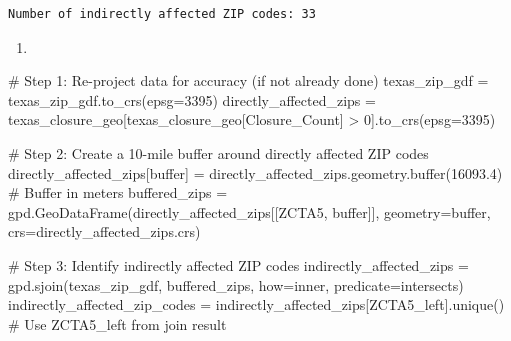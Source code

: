 \documentclass[
  letterpaper,
  DIV=11,
  numbers=noendperiod]{scrartcl}
\newenvironment{Shaded}{\begin{snugshade}}{\end{snugshade}}
\newcommand{\BuiltInTok}[1]{\textcolor[rgb]{0.00,0.23,0.31}{#1}}
\newcommand{\CommentTok}[1]{\textcolor[rgb]{0.37,0.37,0.37}{#1}}
\newcommand{\DecValTok}[1]{\textcolor[rgb]{0.68,0.00,0.00}{#1}}
\newcommand{\FloatTok}[1]{\textcolor[rgb]{0.68,0.00,0.00}{#1}}
\newcommand{\NormalTok}[1]{\textcolor[rgb]{0.00,0.23,0.31}{#1}}
\newcommand{\OperatorTok}[1]{\textcolor[rgb]{0.37,0.37,0.37}{#1}}
\newcommand{\StringTok}[1]{\textcolor[rgb]{0.13,0.47,0.30}{#1}}
\providecommand{\tightlist}{%
  \setlength{\itemsep}{0pt}\setlength{\parskip}{0pt}}\usepackage{longtable,booktabs,array}
\begin{document}
\begin{verbatim}
Number of indirectly affected ZIP codes: 33
\end{verbatim}

\begin{enumerate}
\def\labelenumi{\arabic{enumi}.}
\setcounter{enumi}{3}
\tightlist
\item
\end{enumerate}

\begin{Shaded}
\begin{Highlighting}[]
\CommentTok{\# Step 1: Re{-}project data for accuracy (if not already done)}
\NormalTok{texas\_zip\_gdf }\OperatorTok{=}\NormalTok{ texas\_zip\_gdf.to\_crs(epsg}\OperatorTok{=}\DecValTok{3395}\NormalTok{)}
\NormalTok{directly\_affected\_zips }\OperatorTok{=}\NormalTok{ texas\_closure\_geo[texas\_closure\_geo[}\StringTok{\textquotesingle{}Closure\_Count\textquotesingle{}}\NormalTok{] }\OperatorTok{\textgreater{}} \DecValTok{0}\NormalTok{].to\_crs(epsg}\OperatorTok{=}\DecValTok{3395}\NormalTok{)}

\CommentTok{\# Step 2: Create a 10{-}mile buffer around directly affected ZIP codes}
\NormalTok{directly\_affected\_zips[}\StringTok{\textquotesingle{}buffer\textquotesingle{}}\NormalTok{] }\OperatorTok{=}\NormalTok{ directly\_affected\_zips.geometry.}\BuiltInTok{buffer}\NormalTok{(}\FloatTok{16093.4}\NormalTok{)  }\CommentTok{\# Buffer in meters}
\NormalTok{buffered\_zips }\OperatorTok{=}\NormalTok{ gpd.GeoDataFrame(directly\_affected\_zips[[}\StringTok{\textquotesingle{}ZCTA5\textquotesingle{}}\NormalTok{, }\StringTok{\textquotesingle{}buffer\textquotesingle{}}\NormalTok{]], geometry}\OperatorTok{=}\StringTok{\textquotesingle{}buffer\textquotesingle{}}\NormalTok{, crs}\OperatorTok{=}\NormalTok{directly\_affected\_zips.crs)}

\CommentTok{\# Step 3: Identify indirectly affected ZIP codes}
\NormalTok{indirectly\_affected\_zips }\OperatorTok{=}\NormalTok{ gpd.sjoin(texas\_zip\_gdf, buffered\_zips, how}\OperatorTok{=}\StringTok{\textquotesingle{}inner\textquotesingle{}}\NormalTok{, predicate}\OperatorTok{=}\StringTok{\textquotesingle{}intersects\textquotesingle{}}\NormalTok{)}
\NormalTok{indirectly\_affected\_zip\_codes }\OperatorTok{=}\NormalTok{ indirectly\_affected\_zips[}\StringTok{\textquotesingle{}ZCTA5\_left\textquotesingle{}}\NormalTok{].unique()  }\CommentTok{\# Use \textquotesingle{}ZCTA5\_left\textquotesingle{} from join result}


\end{Highlighting}
\end{Shaded}
\end{document}
